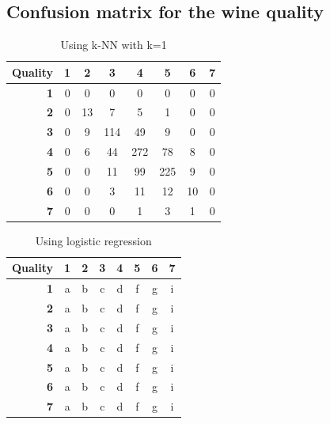 \documentclass[twoside]{article}
\begin{document}
\begin{multicols}{2}
\subsection{Confusion matrix for the wine quality}

\begin{table}[H]
\caption{Using k-NN with k=1}
\centering
\begin{tabular}{r||c|c|c|c|c|c|c}
\textbf{Quality} & \textbf{1} & \textbf{2} & \textbf{3} & \textbf{4} & \textbf{5} & \textbf{6} & \textbf{7}\\
\hline \hline
\textbf{1} & 0 & 0 & 0 & 0 & 0 & 0 & 0	\\
\hline
\textbf{2} & 0 & 13 & 7 & 5 & 1 & 0 & 0\\
\hline
\textbf{3} & 0 & 9 & 114 & 49 & 9 & 0 & 0\\
\hline
\textbf{4} & 0 & 6 & 44 & 272 & 78 & 8 & 0\\
\hline
\textbf{5} & 0 & 0 & 11 & 99 & 225 & 9 & 0\\
\hline
\textbf{6} & 0 & 0 & 3 & 11 & 12 & 10 & 0\\
\hline
\textbf{7} & 0 & 0 & 0 & 1 & 3 & 1 & 0\\
\end{tabular}
\end{table}




\begin{table}[H]
\caption{Using logistic regression}
\centering
\begin{tabular}{r||c|c|c|c|c|c|c}
\textbf{Quality} & \textbf{1} & \textbf{2} & \textbf{3} & \textbf{4} & \textbf{5} & \textbf{6} & \textbf{7}\\
\hline \hline
\textbf{1} & a & b & c & d & f & g & i\\
\hline
\textbf{2} & a & b & c & d & f & g & i\\
\hline
\textbf{3} & a & b & c & d & f & g & i\\
\hline
\textbf{4} & a & b & c & d & f & g & i\\
\hline
\textbf{5} & a & b & c & d & f & g & i\\
\hline
\textbf{6} & a & b & c & d & f & g & i\\
\hline
\textbf{7} & a & b & c & d & f & g & i\\
\end{tabular}
\end{table}




\end{multicols}
\end{document}
